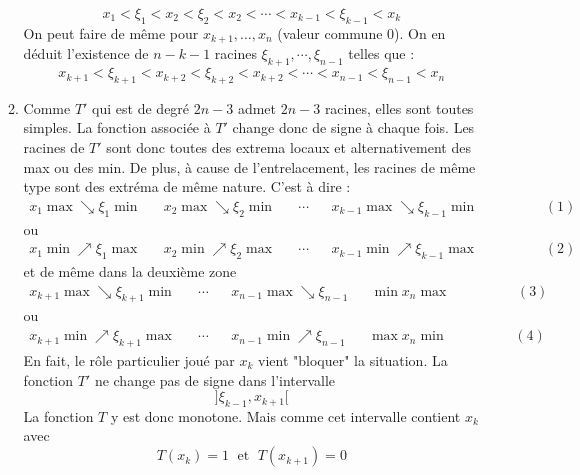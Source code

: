 \begin{enumerate}
\begin{enumerate}
\begin{displaymath}
 x_1<\xi_1 < x_2 < \xi_2 < x_2 < \cdots < x_{k-1} < \xi_{k-1} <x_k
\end{displaymath}
On peut faire de même pour $x_{k+1},\dots,x_n$ (valeur commune $0$). On en déduit l'existence de $n-k-1$ racines $\xi_{k+1},\cdots,\xi_{n-1}$ telles que :
\begin{displaymath}
 x_{k+1}<\xi_{k+1} < x_{k+2} < \xi_{k+2} < x_{k+2} < \cdots < x_{n-1} < \xi_{n-1} < x_n
\end{displaymath}
\item Comme $T'$ qui est de degré $2n-3$ admet $2n-3$ racines, elles sont toutes simples. La fonction associée à $T'$ change donc de signe à chaque fois. Les racines de $T'$ sont donc toutes des extrema locaux et alternativement des max ou des min. \newline
De plus, à cause de l'entrelacement, les racines de même type sont des extréma de même nature. C'est à dire :
\begin{align*}
 x_1 \max \searrow \xi_1\min & & x_2 \max \searrow \xi_2 \min  & & \cdots & & x_{k-1} \max \searrow \xi_{k-1} \min \hspace{2cm}(1)
\end{align*}
ou
\begin{align*}
 x_1 \min \nearrow \xi_1\max & & x_2 \min \nearrow \xi_2 \max & & \cdots & & x_{k-1} \min \nearrow \xi_{k-1} \max \hspace{2cm}(2)
\end{align*}
et de même dans la deuxième zone
\begin{align*}
 x_{k+1} \max \searrow \xi_{k+1}\min & & \cdots & & x_{n-1} \max \searrow \xi_{n-1} & & \min x_n \max \hspace{2cm}(3)
\end{align*}
ou
\begin{align*}
 x_{k+1} \min \nearrow \xi_{k+1}\max & & \cdots & & x_{n-1} \min \nearrow \xi_{n-1} & & \max x_n \min \hspace{2cm}(4)
\end{align*}
En fait, le rôle particulier joué par $x_k$ vient "bloquer" la situation.\newline
La fonction $T'$ ne change pas de signe dans l'intervalle
\begin{displaymath}
 ]\xi_{k-1},x_{k+1}[
\end{displaymath}
La fonction $T$ y est donc monotone. Mais comme cet intervalle contient $x_k$ avec
\begin{displaymath}
 T(x_k)=1 \;\text{ et }\; T(x_{k+1})=0

\end{displaymath}
\end{enumerate}
\end{enumerate}
